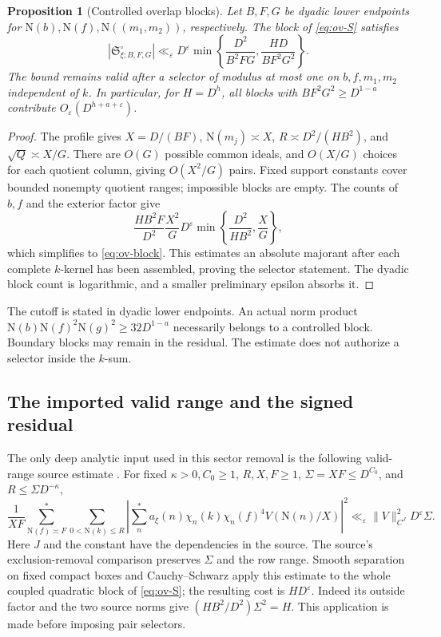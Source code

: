 \documentclass[11pt]{article}
\numberwithin{equation}{section}
\newtheorem{proposition}[theorem]{Proposition}
\theoremstyle{definition}
\theoremstyle{remark}
\newcommand{\N}{\mathrm N}
\newcommand{\eps}{\varepsilon}
\begin{document}
\begin{proposition}[Controlled overlap blocks]\label{prop:ov-block}
Let \(B,F,G\) be dyadic lower endpoints for
\(\N(b),\N(f),\N((m_1,m_2))\), respectively. The block of
\eqref{eq:ov-S} satisfies
\begin{equation}\label{eq:ov-block}
 |\mathfrak S^\circ_{\xi;B,F,G}|
 \ll_\eps D^\eps
       \min\left\{\frac{D^2}{B^2FG},
                    \frac{HD}{BF^2G^2}\right\}.
\end{equation}
The bound remains valid after a selector of modulus at most one
on \(b,f,m_1,m_2\) independent of \(k\). In particular, for
\(H=D^h\), all blocks with \(BF^2G^2\ge D^{1-a}\) contribute
\(O_\eps(D^{h+a+\eps})\).
\end{proposition}
\begin{proof}
The profile gives \(X=D/(BF)\), \(\N(m_j)\asymp X\),
\(R\asymp D^2/(HB^2)\), and \(\sqrt Q\asymp X/G\).
There are \(O(G)\) possible common ideals, and
\(O(X/G)\) choices for each quotient column, giving
\(O(X^2/G)\) pairs. Fixed support constants cover bounded
nonempty quotient ranges; impossible blocks are empty.
The counts of \(b,f\) and the exterior factor give
\[
 \frac{HB^2F}{D^2}\frac{X^2}{G}
       D^\eps\min\left\{\frac{D^2}{HB^2},\frac XG\right\},
\]
which simplifies to \eqref{eq:ov-block}. This estimates an
absolute majorant after each complete \(k\)-kernel has been assembled,
proving the selector statement. The dyadic block count is logarithmic,
and a smaller preliminary epsilon absorbs it.
\end{proof}

The cutoff is stated in dyadic lower endpoints. An actual norm product
\(\N(b)\N(f)^2\N(g)^2\ge32D^{1-a}\) necessarily belongs to a
controlled block. Boundary blocks may remain in the residual.
The estimate does not authorize a selector inside the \(k\)-sum.

\subsection{The imported valid range and the signed residual}

The only deep analytic input used in this sector removal is the
following valid-range source estimate \cite[Proposition~5.1]{OA5}.
For fixed \(\kappa>0,C_0\ge1\), \(R,X,F\ge1\),
\(\Sigma=XF\le D^{C_0}\), and \(R\le\Sigma D^{-\kappa}\),
\begin{equation}\label{eq:ov-imported-positive}
 \frac1{XF}\sum_{\N(f)\asymp F}^{*}
 \sum_{0<\N(k)\le R}
 \left|\sum_n^*a_\xi(n)\chi_n(k)\chi_n(f)^4V(\N(n)/X)\right|^2
 \ll_\eps \|V\|_{C^J}^2D^\eps\Sigma .
\end{equation}
Here \(J\) and the constant have the dependencies in the source.
The source's exclusion-removal comparison preserves \(\Sigma\)
and the row range. Smooth separation on fixed compact boxes and
Cauchy--Schwarz apply this estimate to the whole coupled quadratic
block of \eqref{eq:ov-S}; the resulting cost is \(HD^\eps\).
Indeed its outside factor and the two source norms give
\((HB^2/D^2)\Sigma^2=H\).
This application is made before imposing pair selectors.
\end{document}
